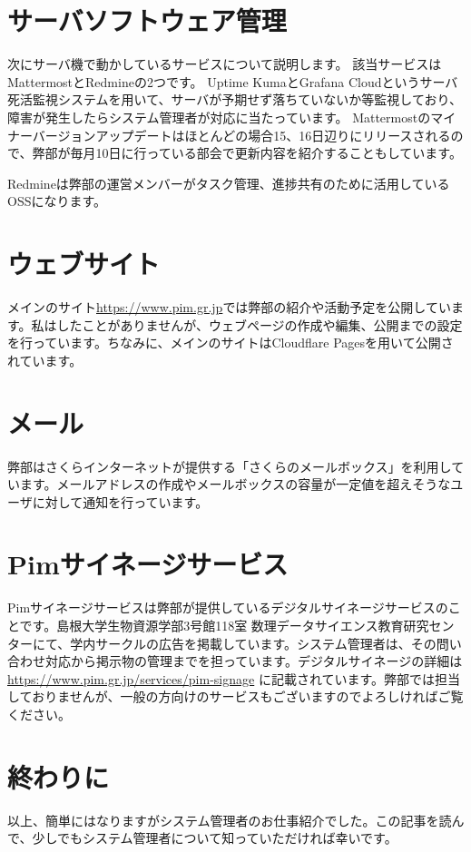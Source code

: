 \documentclass[a4paper,11pt]{jsarticle}
\begin{document}
\section{サーバソフトウェア管理}
次にサーバ機で動かしているサービスについて説明します。
該当サービスはMattermostとRedmineの2つです。
Uptime KumaとGrafana Cloudというサーバ死活監視システムを用いて、サーバが予期せず落ちていないか等監視しており、障害が発生したらシステム管理者が対応に当たっています。
Mattermostのマイナーバージョンアップデートはほとんどの場合15、16日辺りにリリースされるので、弊部が毎月10日に行っている部会で更新内容を紹介することもしています。

Redmineは弊部の運営メンバーがタスク管理、進捗共有のために活用しているOSSになります。

\section{ウェブサイト}
メインのサイト\url{https://www.pim.gr.jp}では弊部の紹介や活動予定を公開しています。私はしたことがありませんが、ウェブページの作成や編集、公開までの設定を行っています。ちなみに、メインのサイトはCloudflare Pagesを用いて公開されています。

\section{メール}
弊部はさくらインターネットが提供する「さくらのメールボックス」を利用しています。メールアドレスの作成やメールボックスの容量が一定値を超えそうなユーザに対して通知を行っています。

\section{Pimサイネージサービス}
Pimサイネージサービスは弊部が提供しているデジタルサイネージサービスのことです。島根大学生物資源学部3号館118室 数理データサイエンス教育研究センターにて、学内サークルの広告を掲載しています。システム管理者は、その問い合わせ対応から掲示物の管理までを担っています。デジタルサイネージの詳細は \url{https://www.pim.gr.jp/services/pim-signage} に記載されています。弊部では担当しておりませんが、一般の方向けのサービスもございますのでよろしければご覧ください。

\section{終わりに}
以上、簡単にはなりますがシステム管理者のお仕事紹介でした。この記事を読んで、少しでもシステム管理者について知っていただければ幸いです。
\end{document}
